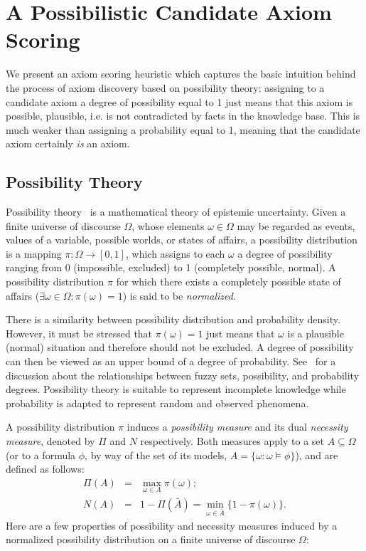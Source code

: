 \documentclass{sig-alternate}
\begin{document}
\section{A Possibilistic Candidate Axiom Scoring}
\label{possibility-theory}

We present an axiom scoring heuristic which captures the basic intuition
behind the process of axiom discovery based on possibility theory: assigning to a candidate axiom a degree of possibility equal to 1 just means that this axiom is possible, plausible, i.e. is not contradicted by facts in the knowledge base. This is  much weaker than assigning a probability equal to 1, meaning that the candidate axiom certainly \textit{is} an axiom.

\subsection{Possibility Theory}

Possibility theory~\cite{Zadeh1978} is a mathematical theory of epistemic uncertainty.
Given a finite universe of discourse $\Omega$, whose elements $\omega\in\Omega$
may be regarded as events, values of a variable, possible worlds, or states of affairs,
a possibility distribution is a mapping $\pi: \Omega \to [0, 1]$,
which assigns to each $\omega$ a degree of possibility ranging from 0 (impossible,
excluded) to 1 (completely possible, normal).
A possibility distribution $\pi$ for  which there exists a completely possible state of
affairs ($\exists \omega \in \Omega: \pi(\omega) = 1$) is said to be \emph{normalized}.

There is a similarity between possibility distribution and probability 
density. However, it must be stressed that $\pi(\omega) = 1$ just means that
$\omega$ is a plausible (normal) situation and therefore should not be excluded.
A degree of possibility can then be viewed as an upper bound of a degree of probability.
See~\cite{dubois1991} for a discussion
about the relationships between fuzzy sets, possibility, and probability 
degrees.
Possibility theory is suitable to represent incomplete knowledge while 
probability is adapted to represent random and observed phenomena. 


A possibility distribution $\pi$ induces a \emph{possibility
measure} and its dual \emph{necessity
measure}, denoted by $\Pi$ and $N$
respectively. Both measures apply to a set $A \subseteq\Omega$ (or to a
formula $\phi$, by way of the set of its models, $A = \{\omega : \omega \models \phi\}$),
and are defined as follows:
\begin{eqnarray}
  \Pi(A) &=& \max_{\omega\in A} \pi(\omega); \\
  N(A)   &=& 1 - \Pi(\bar{A}) = \min_{\omega\in \bar{A}} \{1 - \pi(\omega)\}.
\end{eqnarray}
%
Here are a few properties of possibility and necessity measures 
induced by a normalized possibility distribution on a finite universe of
discourse $\Omega$: 
\end{document}
